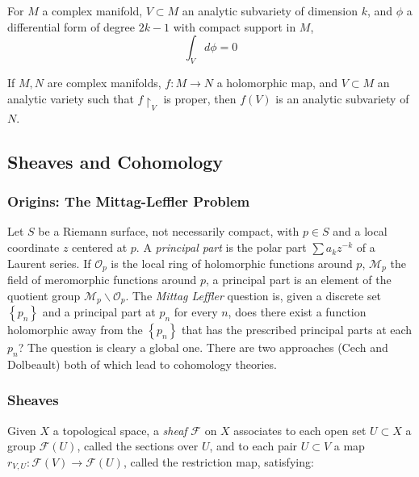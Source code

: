 \begin{thm}

For $M$ a complex manifold, $V \subset M$ an analytic subvariety of dimension $k$, and $\phi$ a differential form of degree $2k-1$ with compact support in $M$,
\[
\int_V d \phi = 0
\]


\end{thm}


\begin{thm}

	If $M,N$ are complex manifolds, $f:M \to N$ a holomorphic map, and $V \subset M$ an analytic variety such that $f \restriction_V$ is proper, then $f(V)$ is an analytic subvariety of $N$.

\end{thm}

\subsection{Sheaves and Cohomology}

\subsubsection{Origins: The Mittag-Leffler Problem}
Let $S$ be a Riemann surface, not necessarily compact, with $p \in S$ and a local coordinate $z$ centered at $p$. A \textit{principal part} is the polar part $ \sum a_k z^{-k}$ of a Laurent series. If $ \mathcal{O}_p$ is the local ring of holomorphic functions around $p$, $ \mathcal{M}_p$ the field of meromorphic functions around $p$, a principal part is an element of the quotient group $ \mathcal{M}_p \backslash \mathcal{O}_p$. The \textit{Mittag Leffler} question is, given a discrete set $ \left\{ p_n \right\} $ and a principal part at $p_n$ for every $n$, does there exist a function holomorphic away from the $ \left\{ p_n \right\} $ that has the prescribed principal parts at each $p_n$? The question is cleary a global one. There are two approaches (Cech and Dolbeault) both of which lead to cohomology theories.

\subsubsection{Sheaves}

\indent Given $X$ a topological space, a \textit{sheaf} $ \mathcal{F}$ on $X$ associates to each open set $U \subset X$ a group $ \mathcal{F}(U)$, called the sections over $U$, and to each pair $U \subset V$  a map $ r_{V,U}: \mathcal{F}(V) \to \mathcal{F}(U)$, called the restriction map, satisfying:

